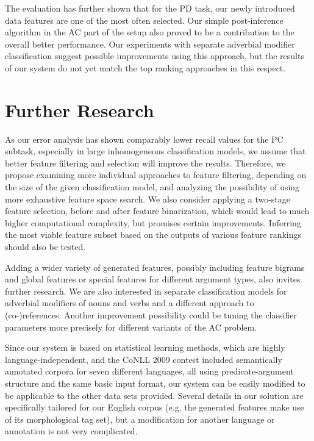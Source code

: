 \documentclass[12pt,notitlepage]{report}
\begin{document}
The evaluation has further shown that for the PD task, our newly introduced data features are one of the most often selected. Our simple post-inference algorithm in the AC part of the setup also proved to be a contribution to the overall better performance. Our experiments with separate adverbial modifier classification suggest possible improvements using this approach, but the results of our system do not yet match the top ranking approaches in this respect.

\section{Further Research}\label{further-work}

As our error analysis has shown comparably lower recall values for the PC subtask, especially in large inhomogeneous classification models, we assume that better feature filtering and selection will improve the results. Therefore, we propose examining more individual approaches to feature filtering, depending on the size of the given classification model, and analyzing the possibility of using more exhaustive feature space search. We also consider applying a two-stage feature selection, before and after feature binarization, which would lead to much higher computational complexity, but promises certain improvements. Inferring the most viable feature subset based on the outputs of various feature rankings should also be tested.

Adding a wider variety of generated features, possibly including feature bigrams and global features \citep{nugues09} or special features for different argument types, also invites further research. We are also interested in separate classification models for adverbial modifiers of nouns and verbs and a different approach to (co-)references. Another improvement possibility could be tuning the classifier parameters more precisely for different variants of the AC problem.

Since our system is based on statistical learning methods, which are highly language-independent, and the CoNLL 2009 contest included semantically annotated corpora for seven different languages, all using predicate-argument structure and the same basic input format, our system can be easily modified to be applicable to the other data sets provided. Several details in our solution are specifically tailored for our English corpus (e.g. the generated features make use of its morphological tag set), but a modification for another language or annotation is not very complicated.
\end{document}
